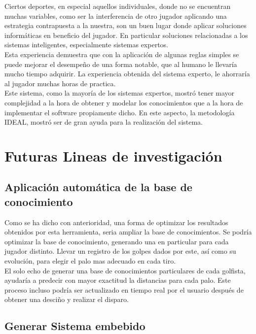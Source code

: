 \documentclass[runningheads,a4paper]{llncs}
\begin{document}
  Ciertos deportes, en especial aquellos individuales, donde no se encuentran
  muchas variables, como ser la interferencia de otro jugador aplicando una
  estrategia contrapuesta a la nuestra, son un buen lugar donde aplicar
  soluciones informáticas en beneficio del jugador. En particular soluciones
  relacionadas a los sistemas inteligentes, especialmente sistemas expertos.\\
  Esta experiencia demuestra que con la aplicación de algunas reglas simples se
  puede mejorar el desempeño de una forma notable, que al humano le llevaría
  mucho tiempo adquirir. La experiencia obtenida del sistema experto, le
  ahorraría al jugador muchas horas de practica.\\ Este sistema, como la mayoría
  de los sistemas expertos, mostró tener mayor complejidad a la hora de  obtener
  y modelar los conocimientos que a la hora de implementar el software
  propiamente dicho. En este aspecto, la metodología IDEAL, mostró ser de gran
  ayuda para la realización del sistema.

\section{Futuras Lineas de investigación}

\subsection{Aplicación automática de la base de conocimiento}

  Como se ha dicho con anterioridad, una forma de optimizar los resultados
  obtenidos por esta herramienta, seria ampliar la base de conocimientos. Se
  podría optimizar la base de conocimiento, generando una en particular para cada
  jugador distinto. Llevar un registro de los golpes dados por este, así como su
  evolución, para elegir el palo mas adecuado en cada tiro.\\ El solo echo de
  generar una base de conocimientos particulares de cada golfista, ayudaría a
  predecir con mayor exactitud la distancias para cada palo. Este proceso incluso
  podría ser actualizado en tiempo real por el usuario después de obtener una
  desciño y realizar el disparo.\\

\subsection{Generar Sistema embebido}
\end{document}
